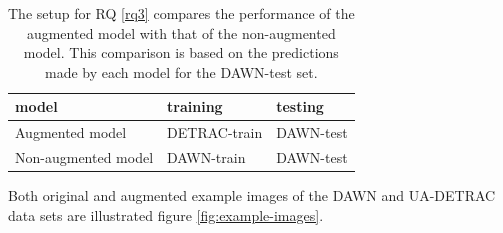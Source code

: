 \documentclass[]{article}
\begin{document}
	\begin{table}[H]
		\captionsetup{font=scriptsize}
		\centering
		\small
		\begin{tabular}{lll}
			\toprule
			\textbf{model} & \textbf{training} & \textbf{testing} \\
			\midrule
			Augmented model & DETRAC-train & DAWN-test \\
			\hline
			Non-augmented model & DAWN-train & DAWN-test \\
			\bottomrule
		\end{tabular}
		\caption{The setup for RQ \ref{rq3} compares the performance of the augmented model with that of the non-augmented model. This comparison is based on the predictions made by each model for the DAWN-test set.}
		\label{table:setuprq3}
	\end{table}

	Both original and augmented example images of the DAWN and UA-DETRAC data sets are illustrated figure \ref{fig:example-images}.
	
\end{document}
